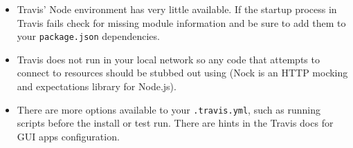 \begin{itemize}
    \begin{itemize}
    \item
    Travis' Node environment has very little available. If the startup process in Travis fails check for missing module information and be sure to add them to your \verb|package.json| dependencies.
    \item
    Travis does not run in your local network so any code that attempts to connect to resources should be stubbed out using 
     (Nock is an HTTP mocking and expectations library for Node.js).
    \item
    There are more options available to your \verb|.travis.yml|, such as running scripts before the install or test run. There are hints in the Travis docs for GUI apps configuration.
    \end{itemize}
\end{itemize}
